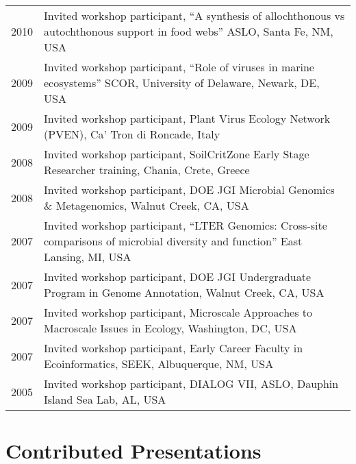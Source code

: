 \documentclass[11pt]{article}
\begin{document}
\begin{longtable}{@{}p{2cm}@{\hspace{1em}}p{14cm}@{}}
2010 & Invited workshop participant, “A synthesis of allochthonous vs autochthonous support in food webs” ASLO, Santa Fe, NM, USA \\
2009 & Invited workshop participant, “Role of viruses in marine ecosystems” SCOR, University of Delaware, Newark, DE, USA \\
2009 & Invited workshop participant, Plant Virus Ecology Network (PVEN), Ca’ Tron di Roncade, Italy \\
2008 & Invited workshop participant, SoilCritZone Early Stage Researcher training, Chania, Crete, Greece \\
2008 & Invited workshop participant, DOE JGI Microbial Genomics \& Metagenomics, Walnut Creek, CA, USA \\
2007 & Invited workshop participant, “LTER Genomics: Cross-site comparisons of microbial diversity and function” East Lansing, MI, USA \\
2007 & Invited workshop participant, DOE JGI Undergraduate Program in Genome Annotation, Walnut Creek, CA, USA \\
2007 & Invited workshop participant, Microscale Approaches to Macroscale Issues in Ecology, Washington, DC, USA \\
2007 & Invited workshop participant, Early Career Faculty in Ecoinformatics, SEEK, Albuquerque, NM, USA \\
2005 & Invited workshop participant, DIALOG VII, ASLO, Dauphin Island Sea Lab, AL, USA \\
\end{longtable}

\section*{Contributed Presentations}
\vspace{-0.5em}
\end{document}
